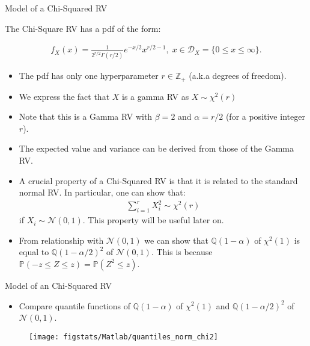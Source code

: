 \documentclass[9pt]{beamer}
\begin{document}
%
\begin{frame}{Model of a Chi-Squared RV}

The Chi-Square RV has a pdf of the form:
\begin{block}{}
\begin{align*}
f_X(x)=\frac{1}{2^{r/2}\Gamma(r/2)}e^{-x/2}x^{r/2-1},\; x\in \mathcal{D}_X=\{0\leq x\leq \infty\}.
\end{align*}
\end{block}
\begin{itemize}
\item The pdf has only one hyperparameter $r\in \mathbb{Z}_+$ (a.k.a degrees of freedom).
\item We express the fact that $X$ is a gamma RV as $X\sim \chi^2(r)$
\item Note that this is a Gamma RV with $\beta=2$ and $\alpha=r/2$ (for a positive integer $r$). 
\item The expected value and variance can be derived from those of the Gamma RV.  
\item A crucial property of a Chi-Squared RV is that it is related to the standard normal RV. In particular, one can show that: 
\begin{align*}
\sum_{i=1}^rX_i^2\sim \chi^2(r)
\end{align*}
if $X_i\sim \mathcal{N}(0,1)$. This property will be useful later on. 
\item From relationship with $\mathcal{N}(0,1)$ we can show that $\mathbb{Q}(1-\alpha)$ of $\chi^2(1)$ is equal to $\mathbb{Q}(1-\alpha/2)^2$ of $\mathcal{N}(0,1)$. This is because $\mathbb{P}(-z\leq Z\leq z)=\mathbb{P}(Z^2\leq z)$.  
\end{itemize}

\end{frame}

%
\begin{frame}{Model of an Chi-Squared RV}
\begin{itemize}
\item Compare quantile functions of $\mathbb{Q}(1-\alpha)$ of $\chi^2(1)$ and $\mathbb{Q}(1-\alpha/2)^2$ of $\mathcal{N}(0,1)$.
\end{itemize}
\begin{figure}[!htb]
    \centering
	\texttt{[image: figstats/Matlab/quantiles\_norm\_chi2]}
\end{figure}
\end{frame}
\end{document}
